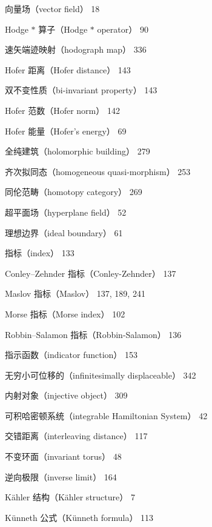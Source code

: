{\noindent\hspace*{1.5em}向量场（vector field） 18\par
\noindent Hodge $*$ 算子（Hodge $*$ operator） 90\par
\noindent 速矢端迹映射（hodograph map） 336\par
\noindent Hofer 距离（Hofer distance） 143\par
\noindent\hspace*{1.5em}双不变性质（bi-invariant property） 143\par
\noindent Hofer 范数（Hofer norm） 142\par
\noindent Hofer 能量（Hofer's energy） 69\par
\noindent 全纯建筑（holomorphic building） 279\par
\noindent 齐次拟同态（homogeneous quasi-morphism） 253\par
\noindent 同伦范畴（homotopy category） 269\par
\noindent 超平面场（hyperplane field） 52\par
\noindent 理想边界（ideal boundary） 61\par
\noindent 指标（index） 133\par
\noindent\hspace*{1.5em}Conley–Zehnder 指标（Conley-Zehnder） 137\par
\noindent\hspace*{1.5em}Maslov 指标（Maslov） 137, 189, 241\par
\noindent\hspace*{1.5em}Morse 指标（Morse index） 102\par
\noindent\hspace*{1.5em}Robbin–Salamon 指标（Robbin-Salamon） 136\par
\noindent 指示函数（indicator function） 153\par
\noindent 无穷小可位移的（infinitesimally displaceable） 342\par
\noindent 内射对象（injective object） 309\par
\noindent 可积哈密顿系统（integrable Hamiltonian System） 42\par
\noindent 交错距离（interleaving distance） 117\par
\noindent 不变环面（invariant torus） 48\par
\noindent 逆向极限（inverse limit） 164\par
\noindent Kähler 结构（Kähler structure） 7\par
\noindent Künneth 公式（Künneth formula） 113\par
}
